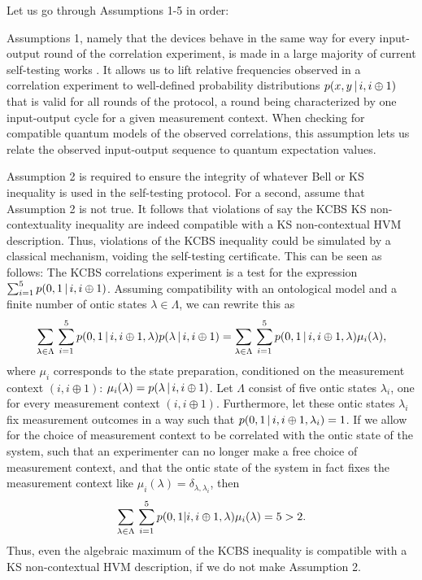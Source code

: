Let us go through Assumptions 1-5 in order:

Assumptions 1, namely that the devices behave in the same way for every input-output round of the correlation experiment, is made in a large majority of current self-testing works \cite{Supic2020}. It allows us to lift relative frequencies observed in a correlation experiment to well-defined probability distributions $p(x,y\thinspace\vert\thinspace i, i\oplus 1)$ that is valid for all rounds of the protocol, a round being characterized by one input-output cycle for a given measurement context. When checking for compatible quantum models of the observed correlations, this assumption lets us relate the observed input-output sequence to quantum expectation values.

Assumption 2 is required to ensure the integrity of whatever Bell or KS inequality is used in the self-testing protocol. For a second, assume that Assumption 2 is not true. It follows that violations of say the KCBS KS non-contextuality inequality are indeed compatible with a KS non-contextual HVM description. Thus, violations of the KCBS inequality could be simulated by a classical mechanism, voiding the self-testing certificate. This can be seen as follows:
The KCBS correlations experiment is a test for the expression $\sum_{i=1}^5 p(0,1\thinspace\vert\thinspace i,i\oplus1)$. Assuming compatibility with an ontological model and a finite number of ontic states $\lambda\in\Lambda$, we can rewrite this as \begin{align*}
\sum_{\lambda\in\Lambda}\thinspace\sum_{i=1}^5 p(0,1\thinspace\vert\thinspace i,i\oplus1,\lambda) p(\lambda\thinspace\vert\thinspace i,i\oplus 1)=\sum_{\lambda\in\Lambda}\thinspace\sum_{i=1}^5 p(0,1\thinspace\vert\thinspace i,i\oplus1,\lambda)\mu_i(\lambda),
\end{align*} where $\mu_i$ corresponds to the state preparation, conditioned on the measurement context $(i,i\oplus 1)$: $\mu_i(\lambda)=p(\lambda\thinspace\vert\thinspace i,i\oplus 1)$. Let $\Lambda$ consist of five ontic states $\lambda_i$, one for every measurement context $(i,i\oplus 1)$. Furthermore, let these ontic states $\lambda_i$ fix measurement outcomes in a way such that $p(0,1\thinspace\vert\thinspace i,i\oplus 1 ,\lambda_i)=1$. If we allow for the choice of measurement context to be correlated with the ontic state of the system, such that an experimenter can no longer make a free choice of measurement context, and that the ontic state of the system in fact fixes the measurement context like $\mu_i(\lambda)=\delta_{\lambda,\lambda_i}$, then
\begin{equation*}
    \sum_{\lambda\in\Lambda}\thinspace\sum_{i=1}^5 p(0,1\vert i,i\oplus1,\lambda)\mu_i(\lambda)=5>2.
\end{equation*}
Thus, even the algebraic maximum of the KCBS inequality is compatible with a KS non-contextual HVM description, if we do not make Assumption 2.

